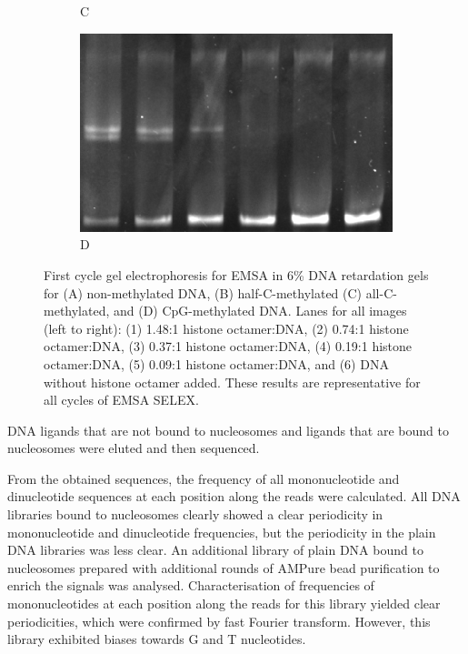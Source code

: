 \documentclass[parskip=full, numbers=noenddot]{scrreprt}
\begin{document}
\begin{figure}[htpb]
\begin{subfigure}[htpb]{0.4\textwidth}
    \caption{C}
    \label{fig:reconstnuc_c}
  \end{subfigure}
  \begin{subfigure}[htpb]{0.4\textwidth}
    \centering
    \includegraphics[width=\textwidth]{reconstnuc_d}
    \caption{D}
    \label{fig:reconstnuc_d}
  \end{subfigure}
  \caption{First cycle gel electrophoresis for EMSA in 6\% DNA retardation gels for (A) non-methylated DNA, (B) half-C-methylated (C) all-C-methylated, and (D) CpG-methylated DNA. Lanes for all images (left to right): (1) 1.48:1 histone octamer:DNA, (2) 0.74:1 histone octamer:DNA, (3) 0.37:1 histone octamer:DNA, (4) 0.19:1 histone octamer:DNA, (5) 0.09:1 histone octamer:DNA, and (6) DNA without histone octamer added.  These results are representative for all cycles of EMSA SELEX.}
  \label{fig:reconstnuc}
\end{figure}

DNA ligands that are not bound to nucleosomes and ligands that are bound to nucleosomes were eluted and then sequenced.

From the obtained sequences, the frequency of all mononucleotide and dinucleotide sequences at each position along the reads were calculated.  All DNA libraries bound to nucleosomes clearly showed a clear periodicity in mononucleotide and dinucleotide frequencies, but the periodicity in the plain DNA libraries was less clear.
An additional library of plain DNA bound to nucleosomes prepared with additional rounds of AMPure bead purification to enrich the signals was analysed.  Characterisation of frequencies of mononucleotides at each position along the reads for this library yielded clear periodicities, which were confirmed by fast Fourier transform.  However, this library exhibited biases towards G and T nucleotides.
\end{document}
